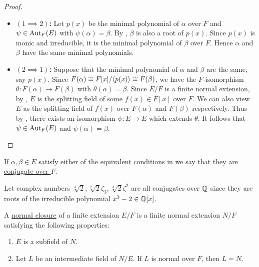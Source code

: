 \documentclass[11pt]{article}
\begin{document}
\begin{proof}\,
    \begin{itemize}
        \item\textbf{$(1\implies2)$:} Let $p(x)$ be the minimal polynomial of $\alpha$ over $F$ and $\psi\in\operatorname{Aut}_F(E)$ with $\psi(\alpha)=\beta$. By , $\beta$ is also a root of $p(x)$. Since $p(x)$ is monic and irreducible, it is the minimal polynomial of $\beta$ over $F$. Hence $\alpha$ and $\beta$ have the same minimal polynomials.

        \item\textbf{$(2\implies1)$:} Suppose that the minimal polynomial of $\alpha$ and $\beta$ are the same, say $p(x)$. Since $F(\alpha)\cong F[x]/\langle p(x)\rangle\cong F(\beta)$, we have the $F$-isomorphism $\theta:F(\alpha)\to F(\beta)$ with $\theta(\alpha)=\beta$. Since $E/F$ is a finite normal extension, by , $E$ is the splitting field of some $f(x)\in F[x]$ over $F$. We can also view $E$ as the splitting field of $f(x)$ over $F(\alpha)$ and $F(\beta)$ respectively. Thus by , there exists an isomorphism $\psi:E\to E$ which extends $\theta$. It follows that $\psi\in\operatorname{Aut}_F(E)$ and $\psi(\alpha)=\beta$.
    \end{itemize}
\end{proof}

\begin{notation}
    If $\alpha,\beta\in E$ satisfy either of the equivalent conditions in  we say that they are \ul{conjugate over $F$}.
\end{notation}

\begin{example}
    Let complex numbers $\sqrt[3]{2},\sqrt[2]{2}\zeta_3,\sqrt[3]{2}\zeta^2$ are all conjugates over $\mathbb{Q}$ since they are roots of the irreducible polynomial $x^3-2\in\mathbb{Q}[x]$.
\end{example}

\begin{definition}
    A \ul{normal closure} of a finite extension $E/F$ is a finite normal extension $N/F$ satisfying the following properties:
    \begin{enumerate}
        \item $E$ is a subfield of $N$.
        \item Let $L$ be an intermediate field of $N/E$. If $L$ is normal over $F$, then $L=N$.
    \end{enumerate}
\end{definition}
\end{document}
